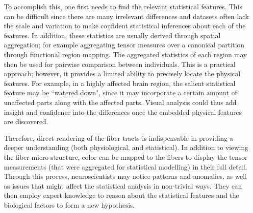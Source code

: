 To accomplish this, one first needs to find the relevant statistical features. 
This can be difficult since there are many irrelevant differences and datasets often lack the scale and variation to make confident statistical inferences about each of the features. %
In addition, these statistics are usually derived through spatial aggregation; %
for example aggregating tensor measures over a canonical partition through functional region mapping. The aggregated statistics of each region may then be used for pairwise comparison between individuals. This is a practical approach; however, it provides a limited ability to precisely locate the physical features. For example, in a highly affected brain region, the salient statistical feature may be ``watered down", since it may incorporate a certain amount of unaffected parts along with the affected parts. Visual analysis could thus add insight and confidence into the differences once the embedded physical features are discovered.

Therefore, direct rendering of the fiber tracts is indispensable in providing a deeper understanding (both physiological, and statistical). In addition to viewing the fiber micro-structure, color can be mapped to the fibers to display the tensor measurements (that were aggregated for statistical modelling) in their full detail. Through this process, neuroscientists may notice patterns and anomalies, as well as issues that might affect the statistical analysis in non-trivial ways. They can then employ expert knowledge to reason about the statistical features and the biological factors to form a new hypothesis.


